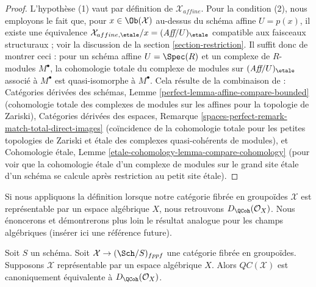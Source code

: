 \begin{proof}
L'hypothèse (1) vaut par définition de $\mathcal{X}_{affine}$.
Pour la condition (2), nous employons le fait que, pour $x \in \Ob(\mathcal{X})$
au-dessus du schéma affine $U = p(x)$, il existe une équivalence
$\mathcal{X}_{affine, \etale}/x = (\textit{Aff}/U)_\etale$ compatible
aux faisceaux structuraux ; voir la
discussion de la section \ref{section-restriction}.
Il suffit donc de montrer ceci : pour un schéma affine $U = \Spec(R)$
et un complexe de $R$-modules $M^\bullet$, la cohomologie totale
du complexe de modules sur $(\textit{Aff}/U)_\etale$
associé à $M^\bullet$ est quasi-isomorphe à $M^\bullet$.
Cela résulte de la combinaison de :
Catégories dérivées des schémas, Lemme
\ref{perfect-lemma-affine-compare-bounded} (cohomologie totale des complexes
de modules sur les affines pour la topologie de Zariski),
Catégories dérivées des espaces, Remarque
\ref{spaces-perfect-remark-match-total-direct-images}
(coïncidence de la cohomologie totale pour les petites
topologies de Zariski et \'etale des
complexes quasi-cohérents de modules), et
Cohomologie \'etale, Lemme \ref{etale-cohomology-lemma-compare-cohomology}
(pour voir que la cohomologie \'etale d'un complexe de modules
sur le grand site \'etale d'un schéma
se calcule après restriction au petit site \'etale).
\end{proof}

\noindent
Si nous appliquons la définition lorsque notre catégorie fibrée en groupoïdes
$\mathcal{X}$ est représentable par un espace algébrique $X$, nous
retrouvons $D_\QCoh(\mathcal{O}_X)$. Nous énoncerons et démontrerons plus loin le
résultat analogue pour les champs algébriques (insérer ici une référence future).

\begin{proposition}
\label{proposition-QC-compare}
Soit $S$ un schéma. Soit $\mathcal{X} \to (\Sch/S)_{fppf}$ une catégorie
fibrée en groupoïdes. Supposons $\mathcal{X}$ représentable par un espace
algébrique $X$. Alors $\mathit{QC}(\mathcal{X})$ est canoniquement équivalente à
$D_\QCoh(\mathcal{O}_X)$.
\end{proposition}

